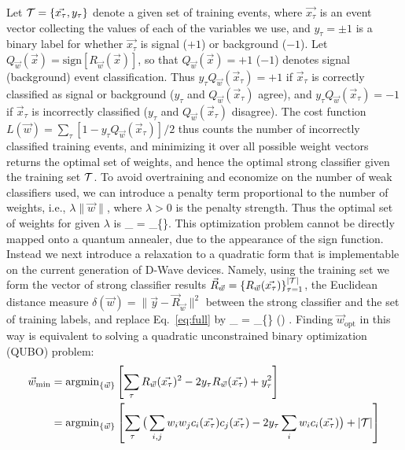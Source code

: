 Let $\mathcal{T} = \{\vec{x_\tau}, y_\tau\}$ denote a given set of training events, where $\vec{x_\tau}$ is an event vector collecting the values of each of the variables we use, and $y_\tau =\pm 1$ is a binary label for whether $\vec{x_\tau}$ is signal ($+1$) or background ($-1$). Let $Q_{\vec{w}}(\vec{x}) = \mathrm{sign}[R_{\vec{w}}(\vec{x})]$, so that $Q_{\vec{w}}(\vec{x})=+1$ ($-1$) denotes signal (background) event classification. Thus $y_\tau Q_{\vec{w}}(\vec{x}_{\tau})=+1$ if $\vec{x}_{\tau}$ is correctly classified as signal or background ($y_\tau$ and $Q_{\vec{w}}(\vec{x}_{\tau})$ agree), and $y_\tau Q_{\vec{w}}(\vec{x}_{\tau})=-1$ if $\vec{x}_{\tau}$ is incorrectly classified ($y_\tau$ and $Q_{\vec{w}}(\vec{x}_{\tau})$ disagree). The cost function $L(\vec{w}) = \sum_{\tau} [1-y_\tau Q_{\vec{w}}(\vec{x}_{\tau})]/2$ thus counts the number of incorrectly classified training events, and minimizing it over all possible weight vectors returns the optimal set of weights, and hence the optimal strong classifier given the training set $\mathcal{T}$. To avoid overtraining and economize on the number of weak classifiers used, we can introduce a penalty term proportional to the number of weights, i.e., $\lambda \|\vec{w}\|$, where $\lambda>0$ is the penalty strength. Thus the optimal set of weights for given $\lambda$ is
\beq
{}_{} = _{\{\}} .
\label{eq:full}
\eeq
This optimization problem cannot be directly mapped onto a quantum annealer, due to the appearance of the sign function.
Instead we next introduce a relaxation to a quadratic form that is implementable on the current generation of D-Wave devices. Namely, using the training set we form the vector of strong classifier results $\vec{R}_{\vec{w}} = \{R_{\vec{w}}(\vec{x_\tau})\}_{\tau=1}^{|\mathcal{T}|}$, the Euclidean distance measure $\delta(\vec{w})=\|\vec{y}-\vec{R}_{\vec{w}}\|^2$ between the strong classifier and the set of training labels, and replace Eq.~\eqref{eq:full} by
\beq
{}_{\min} = _{\{\}} \delta() .
\eeq
Finding $\vec{w}_{\mathrm{opt}}$ in this way is equivalent to solving a quadratic unconstrained binary optimization (QUBO) problem:
\begin{align}
\vec{w}_{\min}  & = \mathrm{argmin}_{\{\vec{w}\}}
 		\left[\sum_\tau R_{\vec{w}}(\vec{x_\tau})^2-2y_\tau R_{\vec{w}}(\vec{x_\tau}) + y_\tau^2 \right] \\
		& =  \mathrm{argmin}_{\{\vec{w}\}} \left[\sum_\tau \big(\sum_{i,j} w_i w_j c_i(\vec{x_\tau}) c_j(\vec{x_\tau}) - 2 y_\tau \sum_{i} w_i c_i(\vec{x_\tau})\big) + \abs{\mathcal{T}} \right]
\end{align}
